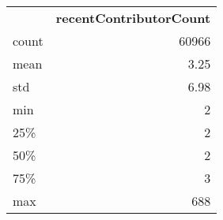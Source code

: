 \begin{tabular}{lr}
 & \textbf{recentContributorCount} \\
count & 60966 \\
mean & 3.25 \\
std & 6.98 \\
min & 2 \\
25\% & 2 \\
50\% & 2 \\
75\% & 3 \\
max & 688 \\
\end{tabular}
